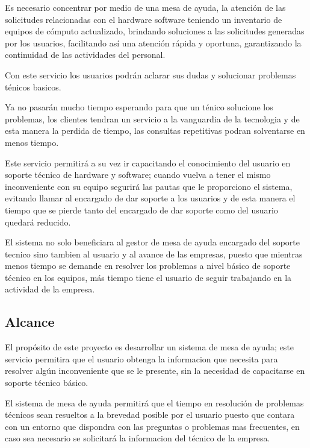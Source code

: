 \documentclass[preprint,12pt]{elsarticle}
\begin{document}
Es necesario concentrar por medio de una mesa de ayuda, la atención de las solicitudes relacionadas con el hardware  software teniendo un inventario de equipos de cómputo actualizado, brindando soluciones a las solicitudes generadas por los usuarios, facilitando así una atención rápida y oportuna, garantizando la continuidad de las actividades del personal.

Con este servicio los usuarios podrán aclarar sus dudas y solucionar problemas ténicos basicos.

Ya no pasarán mucho tiempo esperando para que un ténico solucione los problemas, los clientes tendran un servicio a la vanguardia de la tecnologia y de esta manera la perdida de tiempo, las consultas repetitivas podran solventarse en menos tiempo.

Este servicio permitirá a su vez ir capacitando el conocimiento del usuario en soporte técnico de hardware y software; cuando vuelva a tener el mismo inconveniente con su equipo segurirá las pautas que le proporciono el sistema, evitando llamar al encargado de dar soporte a los usuarios y de esta manera el tiempo que se pierde tanto del encargado de dar soporte como del usuario quedará reducido.

El sistema no solo beneficiara al gestor de mesa de ayuda encargado del soporte tecnico sino tambien al usuario y al avance de las empresas, puesto que mientras menos tiempo se demande en resolver los problemas a nivel básico de soporte técnico en los equipos, más tiempo tiene el usuario de seguir trabajando en la actividad de la empresa.



\subsection {\textbf{Alcance}}
El propósito de este proyecto es desarrollar un sistema de mesa de ayuda; este servicio permitira que el usuario obtenga la informacion que necesita para resolver algún inconveniente que se le presente, sin la necesidad de capacitarse en soporte técnico básico.

El sistema de mesa de ayuda permitirá que el tiempo en resolución de problemas técnicos sean resueltos a la brevedad posible por el usuario puesto que contara con un entorno que dispondra con las preguntas o problemas mas frecuentes, en caso sea necesario se solicitará la informacion del técnico de la empresa.

\end{document}
